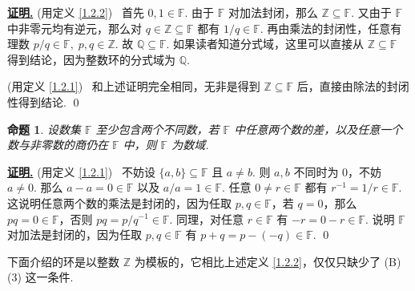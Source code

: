 \documentclass[10pt,openany]{article}
\theoremstyle{thmstyle} %
\theoremstyle{defstyle} %
\theoremstyle{prostyle} %
\newtheorem{proposition}[theorem]{命题}
\renewenvironment{proof}[1][证明]{\par\underline{\textbf{#1.}} \;\fangsong}{\qed\par}
\begin{document}
\begin{proof}
	(用定义 \ref{1.2.2}) \ 首先 \( 0,1 \in \mathbb{F} \). 由于 \( \mathbb{F} \) 对加法封闭，那么 \( \mathbb{Z} \subseteq \mathbb{F} \). 又由于 \( \mathbb{F} \) 中非零元均有逆元，那么对 \( q \in \mathbb{Z} \subseteq \mathbb{F} \) 都有 \( 1/q \in \mathbb{F} \). 再由乘法的封闭性，任意有理数 \( p/q \in \mathbb{F}, \; p,q \in \mathbb{Z} \). 故 \( \mathbb{Q} \subseteq \mathbb{F} \). 如果读者知道分式域，这里可以直接从 \( \mathbb{Z} \subseteq \mathbb{F} \) 得到结论，因为整数环的分式域为 \( \mathbb{Q} \).
	
	\vspace{1ex}
	
	(用定义 \ref{1.2.1}) \ 和上述证明完全相同，无非是得到 \( \mathbb{Z} \subseteq \mathbb{F} \) 后，直接由除法的封闭性得到结论.
\end{proof}

\begin{proposition}
	设数集 \( \mathbb{F} \) 至少包含两个不同数，若 \( \mathbb{F} \) 中任意两个数的差，以及任意一个数与非零数的商仍在 \( \mathbb{F} \) 中，则 \( \mathbb{F} \) 为数域.
\end{proposition}

\begin{proof}
	(用定义 \ref{1.2.1}) \ 不妨设 \( \{a,b\} \subseteq \mathbb{F} \) 且 \( a \neq b \). 则 \( a,b \) 不同时为 \( 0 \)，不妨 \( a \neq 0 \). 那么 \( a-a=0 \in \mathbb{F} \) 以及 \( a/a=1 \in \mathbb{F} \). 任意 \( 0 \neq r \in \mathbb{F} \) 都有 \( r^{-1}=1/r \in \mathbb{F} \). 这说明任意两个数的乘法是封闭的，因为任取 \( p,q \in \mathbb{F} \)，若 \( q=0 \)，那么 \( pq=0 \in \mathbb{F} \)，否则 \( pq=p/q^{-1} \in \mathbb{F} \). 同理，对任意 \( r \in \mathbb{F} \) 有 \( -r=0-r \in \mathbb{F} \). 说明 \( \mathbb{F} \) 对加法是封闭的，因为任取 \( p,q \in \mathbb{F} \) 有 \( p+q=p-(-q) \in \mathbb{F} \).
\end{proof}

\vspace{2ex}

下面介绍的环是以整数 \( \mathbb{Z} \) 为模板的，它相比上述定义 \ref{1.2.2}，仅仅只缺少了 (B)(3) 这一条件. 
\end{document}
